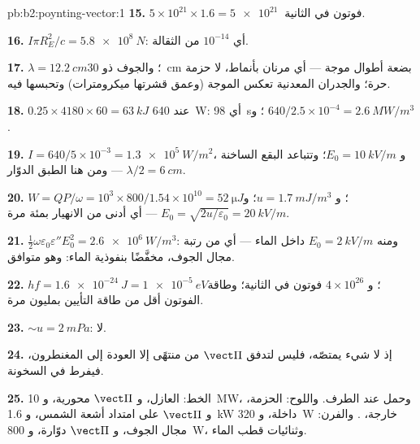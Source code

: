 \begin{solution}{pb:b2:poynting-vector:1}
\textbf{15.} $5 \times 10^{21} \times 1.6 = \qty{5e21}{}$ فوتون في الثانية.

\textbf{16.} $I\pi R_E^2/c = \qty{5.8e8}{N}$: أي $10^{-14}$ من الثقالة.

\textbf{17.} $\lambda = \qty{12.2}{cm}$؛ والجوف ذو \qty{30}{cm} بضعة أطوال موجة
--- أي مرنان بأنماط، لا حزمة حرة؛ والجدران المعدنية تعكس
الموجة (وعمق قشرتها ميكرومترات) وتحبسها فيه.

\textbf{18.} $0.25 \times 4180 \times 60 = \qty{63}{kJ}$ عند \qty{640}{W}: أي \qty{98}{s}؛
و $640/2.5 \times 10^{-4} = \qty{2.6}{MW/m^3}$.

\textbf{19.} $I = 640/5 \times 10^{-3} = \qty{1.3e5}{W/m^2}$، و $E_0 = \qty{10}{kV/m}$؛ وتتباعد البقع
الساخنة $\lambda/2 = \qty{6}{cm}$ --- ومن هنا الطبق الدوّار.

\textbf{20.} $W = QP/\omega = 10^3 \times 800/1.54 \times 10^{10} = \qty{52}{\micro J}$؛ و $u =
\qty{1.7}{mJ/m^3}$؛ و $E_0 = \sqrt{2u/\varepsilon_0} = \qty{20}{kV/m}$ --- أي أدنى من
الانهيار بمئة مرة.

\textbf{21.} $\tfrac12\omega\varepsilon_0\varepsilon''E_0^2 = \qty{2.6e6}{W/m^3}$: ومنه $E_0 = \qty{2}{kV/m}$
داخل الماء --- أي من رتبة مجال الجوف، مخفَّضًا بنفوذية
الماء: وهو متوافق.

\textbf{22.} $hf = \qty{1.6e-24}{J} = \qty{1e-5}{eV}$؛ و $4 \times 10^{26}$ فوتون في الثانية؛
وطاقة الفوتون أقل من طاقة التأيين بمليون مرة.

\textbf{23.} $\sim u = \qty{2}{mPa}$: لا.

\textbf{24.} إذ لا شيء يمتصّه، فليس لتدفق $\vect\Pi$ من
منتهًى إلا العودة إلى المغنطرون، فيفرط في السخونة.

\textbf{25.} الخط: العازل، و $\vect\Pi$ محورية، و \qty{10}{MW}، وحمل عند
الطرف. واللوح: الحزمة، و $\vect\Pi$ على امتداد أشعة الشمس، و \qty{1.6}{kW}
داخلة، و \qty{320}{W} خارجة، . والفرن: مجال الجوف، و $\vect\Pi$
دوّارة، و \qty{800}{W}، وثنائيات قطب الماء.
\end{solution}

